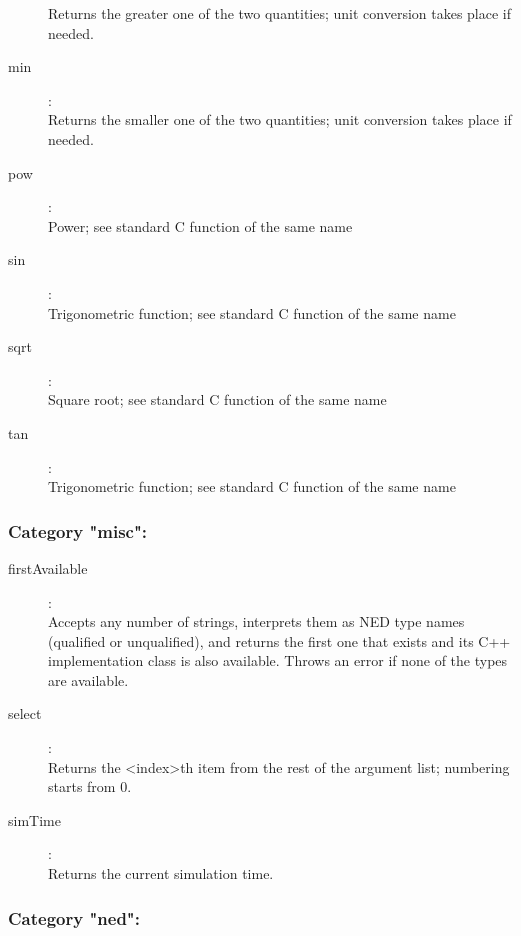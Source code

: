 \begin{description}
    Returns the greater one of the two quantities; unit conversion takes place if needed.
\item[min]:  \\
    Returns the smaller one of the two quantities; unit conversion takes place if needed.
\item[pow]:  \\
    Power; see standard C function of the same name
\item[sin]:  \\
    Trigonometric function; see standard C function of the same name
\item[sqrt]:  \\
    Square root; see standard C function of the same name
\item[tan]:  \\
    Trigonometric function; see standard C function of the same name

\end{description}

\subsubsection{Category "misc":}
\label{sec:ned-functions:category-misc}

\begin{description}
\item[firstAvailable]:  \\
    Accepts any number of strings, interprets them as NED type names (qualified or unqualified), and returns the first one that exists and its C++ implementation class is also available. Throws an error if none of the types are available.
\item[select]:  \\
    Returns the <index>th item from the rest of the argument list; numbering starts from 0.
\item[simTime]:  \\
    Returns the current simulation time.
\end{description}

\subsubsection{Category "ned":}
\label{sec:ned-functions:category-ned}


